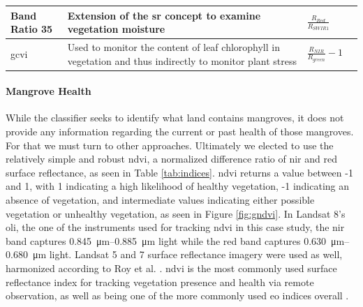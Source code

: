 \begin{table}[H]
\begin{center}
\begin{tabular}{| C{2.5cm} |  L{4.5cm} | C{2.5cm} | C{2cm} |}
Band Ratio 35 & Extension of the \ac{sr} concept to examine vegetation moisture & $\frac{R_{Red}}{R_{SWIR1}}$ & \cite{jiTerminologySpectralVegetation2011} \\ \hline

\ac{gcvi} & Used to monitor the content of leaf chlorophyll in vegetation and thus indirectly to monitor plant stress & $ \frac{R_{NIR}}{R_{green}}-1$ & \cite{wuPotentialSatelliteDerived2012} \\ \hline

\end{tabular}
\end{center}
\end{table}


\paragraph{Mangrove Health} \label{sec:rio-mangrove-health} \leavevmode\newline

While the classifier seeks to identify what land contains mangroves, it does not provide any information regarding the current or past health of those mangroves. For that we must turn to other approaches. Ultimately we elected to use the relatively simple and robust \ac{ndvi}, a normalized difference ratio of \ac{nir} and red surface reflectance, as seen in Table \ref{tab:indices}. \ac{ndvi} returns a value between -1 and 1, with 1 indicating a high likelihood of healthy vegetation, -1 indicating an absence of vegetation, and intermediate values indicating either possible vegetation or unhealthy vegetation, as seen in Figure \ref{fig:gndvi}. In Landsat 8's \ac{oli}, the one of the instruments used for tracking \ac{ndvi} in this case study, the \ac{nir} band captures \SIrange{0.845}{0.885}{\micro\metre} light while the red band captures \SIrange{0.630}{0.680}{\micro\metre} light. Landsat 5 and 7 surface reflectance imagery were used as well, harmonized according to Roy et al. \cite{royCharacterizationLandsat7Landsat82016}. \ac{ndvi} is the most commonly used surface reflectance index for tracking vegetation presence and health via remote observation, as well as being one of the more commonly used \ac{eo} indices overall \cite{fredenMonitoringVegetationSystems1974,haboudaneHyperspectralVegetationIndices2004, pettorelliUsingSatellitederivedNDVI2005}. 

